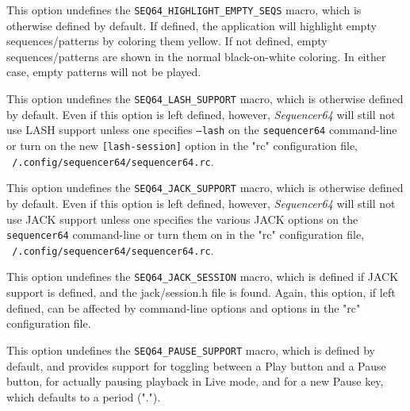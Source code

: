         This option undefines the \texttt{SEQ64\_HIGHLIGHT\_EMPTY\_SEQS}
        macro, which is otherwise defined by default.  If defined, the
        application will
        highlight empty sequences/patterns by coloring them yellow.
        If not defined, empty sequences/patterns are shown in the normal
        black-on-white coloring.  In either case, empty patterns will not be
        played.

        This option undefines the \texttt{SEQ64\_LASH\_SUPPORT} macro, which is
        otherwise defined by default.  Even if this option is left defined,
        however, \textsl{Sequencer64} will still not use LASH support unless
        one specifies \texttt{--lash} on the \texttt{sequencer64} command-line or
        turn on the new \texttt{[lash-session]} option in the "rc"
        configuration file,
        \texttt{~/.config/sequencer64/sequencer64.rc}.

        This option undefines the \texttt{SEQ64\_JACK\_SUPPORT} macro, which is
        otherwise defined by default.  Even if this option is left defined,
        however, \textsl{Sequencer64} will still not use JACK support unless
        one specifies the various JACK options on the \texttt{sequencer64}
        command-line or turn them on in the "rc" configuration file,
        \texttt{~/.config/sequencer64/sequencer64.rc}.

        This option undefines the \texttt{SEQ64\_JACK\_SESSION} macro, which is
        defined if JACK support is defined, and the jack/session.h file is
        found.  Again, this option, if left defined, can be affected by
        command-line options and options in the "rc" configuration file.

        This option undefines the \texttt{SEQ64\_PAUSE\_SUPPORT} macro,
        which is defined by default, and provides support for toggling between
        a Play button and a Pause button, for actually pausing playback
        in Live mode, and for a new Pause key, which defaults to a
        period (".").

